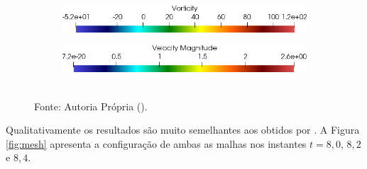 \begin{figure}[h!]
\begin{subfigure}{.49\linewidth}
    \end{subfigure}
    \caption*{Instante $t=8,8$.}
    \begin{subfigure}{.49\linewidth}
        \centering
        \includegraphics[width=\linewidth]{Figuras/rotating-airfoil/lvort.png}
    \end{subfigure}
    \begin{subfigure}{.49\linewidth}
        \centering
        \includegraphics[width=\linewidth]{Figuras/rotating-airfoil/lstr.png}
    \end{subfigure}
    \\Fonte: Autoria Própria (\the\year).
    \label{fig:vort}
\end{figure}

Qualitativamente os resultados são muito semelhantes aos obtidos por . A Figura \ref{fig:mesh} apresenta a configuração de ambas as malhas nos instantes $t=8,0$, $8,2$ e $8,4$.


